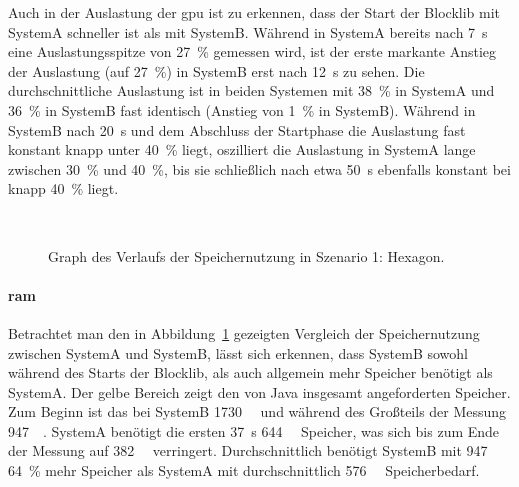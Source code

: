 Auch in der Auslastung der \ac{gpu} ist zu erkennen, dass der Start der Blocklib mit SystemA schneller ist als mit SystemB. Während in SystemA bereits nach \SI{7}{\second} eine Auslastungsspitze von \SI{27}{\percent} gemessen wird, ist der erste markante Anstieg der Auslastung (auf \SI{27}{\percent}) in SystemB  erst nach \SI{12}{\second} zu sehen. Die durchschnittliche Auslastung ist in beiden Systemen mit \SI{38}{\percent} in SystemA und \SI{36}{\percent} in SystemB fast identisch (Anstieg von \SI{1}{\percent} in SystemB). Während in SystemB nach \SI{20}{\second} und dem Abschluss der Startphase die Auslastung fast konstant knapp unter \SI{40}{\percent} liegt, oszilliert die Auslastung in SystemA lange zwischen \SI{30}{\percent} und \SI{40}{\percent}, bis sie schließlich nach etwa \SI{50}{\second} ebenfalls konstant bei knapp \SI{40}{\percent} liegt.

\begin{figure}[!htbp]
	\\
	\caption{Graph des Verlaufs der Speichernutzung in Szenario 1: Hexagon.}\label{fig:seed-0-hexagon-mem}
\end{figure} 
\paragraph{\ac{ram}} Betrachtet man den in Abbildung~\ref{fig:seed-0-hexagon-mem} gezeigten Vergleich der Speichernutzung zwischen SystemA und SystemB, lässt sich erkennen, dass SystemB sowohl während des Starts der Blocklib, als auch allgemein mehr Speicher benötigt als SystemA. Der gelbe Bereich zeigt den von Java insgesamt angeforderten Speicher. Zum Beginn ist das bei SystemB \SI{1730}{\mega\byte} und während des Großteils der Messung \SI{947}{\mega\byte}. SystemA benötigt die ersten \SI{37}{\second} \SI{644}{\mega\byte} Speicher, was sich bis zum Ende der Messung auf \SI{382}{\mega\byte} verringert. Durchschnittlich benötigt SystemB mit \SI{947}{\mega\byte} \SI{64}{\percent} mehr Speicher als SystemA mit durchschnittlich \SI{576}{\mega\byte} Speicherbedarf.

